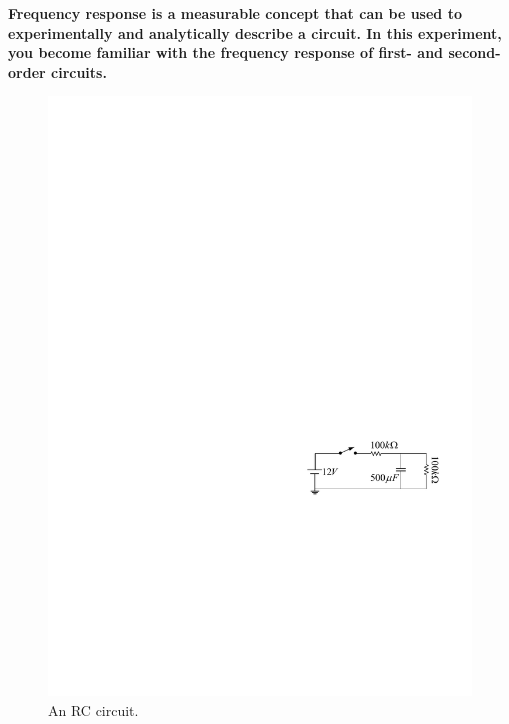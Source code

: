 \documentclass[11pt]{article}
\begin{document}
\textbf{Frequency response is a measurable concept that can be used to experimentally and analytically describe a circuit. In this experiment, you become familiar with the frequency response of first- and second-order circuits.
}



\begin{question}


    \begin{figure}[H]
        \centering
        \includegraphics[scale=1.2,angle=0]{Fig/cir1.pdf}
        \caption{An RC circuit.} \label{fig:cir1}
    \end{figure}


\end{question}
\end{document}
